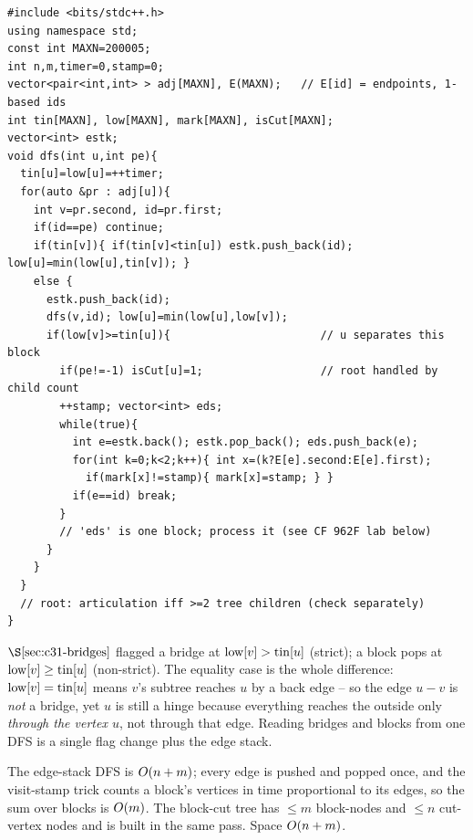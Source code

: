 \begin{lstlisting}[caption={Biconnected components by edge stack. Pop a block when low[child] >= tin[parent]; count distinct vertices of the popped edges with a visit stamp. ASCII only, identifiers without underscores}, label={lst:c31-bcc}]
#include <bits/stdc++.h>
using namespace std;
const int MAXN=200005;
int n,m,timer=0,stamp=0;
vector<pair<int,int> > adj[MAXN], E(MAXN);   // E[id] = endpoints, 1-based ids
int tin[MAXN], low[MAXN], mark[MAXN], isCut[MAXN];
vector<int> estk;
void dfs(int u,int pe){
  tin[u]=low[u]=++timer;
  for(auto &pr : adj[u]){
    int v=pr.second, id=pr.first;
    if(id==pe) continue;
    if(tin[v]){ if(tin[v]<tin[u]) estk.push_back(id); low[u]=min(low[u],tin[v]); }
    else {
      estk.push_back(id);
      dfs(v,id); low[u]=min(low[u],low[v]);
      if(low[v]>=tin[u]){                       // u separates this block
        if(pe!=-1) isCut[u]=1;                  // root handled by child count
        ++stamp; vector<int> eds;
        while(true){
          int e=estk.back(); estk.pop_back(); eds.push_back(e);
          for(int k=0;k<2;k++){ int x=(k?E[e].second:E[e].first);
            if(mark[x]!=stamp){ mark[x]=stamp; } }
          if(e==id) break;
        }
        // 'eds' is one block; process it (see CF 962F lab below)
      }
    }
  }
  // root: articulation iff >=2 tree children (check separately)
}
\end{lstlisting}

\begin{insightbox}
\(\secref{c31-bridges}\) flagged a bridge at \(\mathrm{low}[v]>\operatorname{tin}[u]\) (strict);
a block pops at \(\mathrm{low}[v]\ge\operatorname{tin}[u]\) (non-strict).  The equality case is
the whole difference: \(\mathrm{low}[v]=\operatorname{tin}[u]\) means \(v\)'s subtree reaches \(u\)
by a back edge -- so the edge \(u\!-\!v\) is \emph{not} a bridge, yet \(u\) is still a
hinge because everything reaches the outside only \emph{through the vertex \(u\)}, not
through that edge.  Reading bridges and blocks from one DFS is a single flag change
plus the edge stack.
\end{insightbox}

\begin{complexitybox}
The edge-stack DFS is \(O(n+m)\); every edge is pushed and popped once, and the
visit-stamp trick counts a block's vertices in time proportional to its edges, so
the sum over blocks is \(O(m)\).  The block-cut tree has \(\le m\) block-nodes
and \(\le n\) cut-vertex nodes and is built in the same pass.  Space \(O(n+m)\).
\end{complexitybox}

